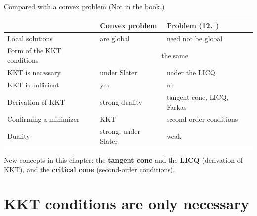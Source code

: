 \documentclass[aspectratio=169,12pt]{beamer}
\begin{document}
\begin{frame}{Compared with a convex problem {\normalfont\small(Not in the book.)}}
  \begin{center}\small\setlength\tabcolsep{6pt}
  \renewcommand{\arraystretch}{1.25}
  \begin{tabular}{lll}
    \toprule
     & Convex problem & Problem (12.1) \\
    \midrule
    Local solutions & are global & need not be global \\
    Form of the KKT conditions & \multicolumn{2}{c}{the same} \\
    KKT is necessary & under Slater & under the LICQ \\
    KKT is sufficient & yes & no \\
    Derivation of KKT & strong duality & tangent cone, LICQ, Farkas \\
    Confirming a minimizer & KKT & second-order conditions \\
    Duality & strong, under Slater & weak \\
    \bottomrule
  \end{tabular}
  \end{center}
  \vspace{0.3em}
  New concepts in this chapter: the \textbf{tangent cone} and the \textbf{LICQ} (derivation of KKT),
  and the \textbf{critical cone} (second-order conditions).
\end{frame}

\section{KKT conditions are only necessary}
\end{document}
